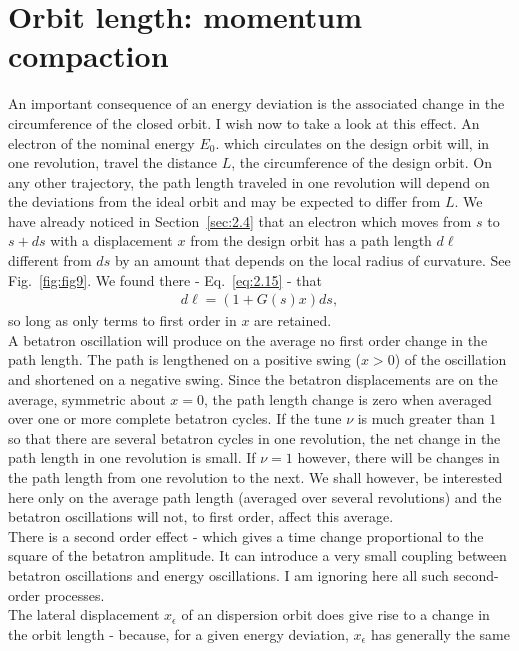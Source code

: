 \section{Orbit length: momentum compaction}\label{sec:3.2}

An important consequence of an energy deviation is the associated change in the circumference
 of the closed orbit. I wish now to take a look at this effect. An electron of the nominal energy $E_0$. which circulates on the design orbit will, in one revolution, travel the distance $L$, the circumference of the design orbit. On any other trajectory, the path length traveled in one revolution will depend on the deviations from the ideal orbit and may be expected to differ from $L$. We have already noticed in Section~\ref{sec:2.4} that an electron which moves from $s$ to $s + ds$ with a displacement $x$ from the design orbit has a path length $d\ell$ different from $ds$ by an amount that depends on the local radius of curvature. See Fig.~\ref{fig:fig9}. We found there - Eq.~\eqref{eq:2.15} - that
\begin{align} \label{eq:3.7}
	d\ell = (1 + G(s)x) ds,
\end{align}
so long as only terms to first order in $x$ are retained.\\
A betatron oscillation will produce on the average no first order change in the path length. The path is lengthened on a positive swing ($x > 0$) of the oscillation and shortened on a negative swing. Since the betatron displacements are on the average, symmetric about $x = 0$, the path length change is zero when averaged over one or more complete betatron cycles. If the tune $\nu$ is much greater than $1$ so that there are several betatron cycles in one revolution, the net
change in the path length in one revolution is small. If $\nu = 1$ however, there will be changes in the path length from one revolution to the next. We shall however, be interested here only on the average path length (averaged over several revolutions) and the betatron oscillations will not, to first order, affect this average.\\
There is a second order effect - which gives a time change proportional to the square of the betatron amplitude. It can introduce a very small coupling between betatron oscillations
 and energy oscillations. I am ignoring here all such second-order processes.\\
 The lateral displacement $x_\epsilon$ of an dispersion orbit does give rise to a change in
the orbit length - because, for a given energy deviation, $x_\epsilon$ has generally the same
